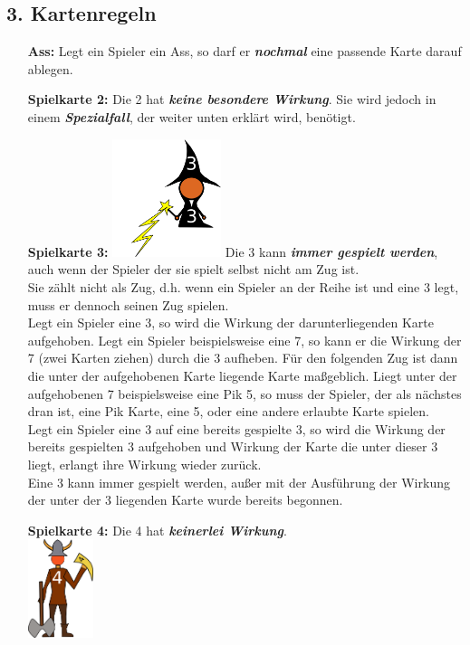 \documentclass{article}
\begin{document}
\subsection*{3. Kartenregeln}       
\begin{itemize}
\item[\textbf{Ass:}] Legt ein Spieler ein Ass, so darf er \textit{\textbf{nochmal}} eine passende Karte darauf ablegen. 
\item[ \textbf{Spielkarte 2:}] Die 2 hat \textit{\textbf{keine besondere Wirkung}}. Sie wird jedoch in einem \textit{\textbf{Spezialfall}}, der weiter unten erklärt wird, benötigt.
\item[\textbf{Spielkarte 3:}]
\includegraphics[width=0.25\textwidth]{photos/wizard.png}
Die 3 kann \textit{\textbf{immer gespielt werden}}, auch wenn der Spieler der sie spielt selbst nicht am Zug ist. \\ Sie zählt nicht als Zug, d.h. wenn ein Spieler an der Reihe ist und eine 3 legt, muss er dennoch seinen Zug spielen. \\
Legt ein Spieler eine 3, so wird die Wirkung der darunterliegenden Karte aufgehoben. Legt ein Spieler beispielsweise eine 7, so kann er die Wirkung der 7 (zwei Karten ziehen) durch die 3 aufheben. Für den folgenden Zug ist dann die
unter der aufgehobenen Karte liegende Karte maßgeblich. Liegt unter der aufgehobenen 7 beispielsweise eine Pik 5, so muss der Spieler, der als nächstes dran ist, eine Pik Karte, eine 5, oder eine andere erlaubte Karte spielen. \\
Legt ein Spieler eine 3 auf eine bereits gespielte 3, so wird die Wirkung der bereits gespielten 3 aufgehoben und Wirkung der Karte die unter dieser 3 liegt, erlangt ihre Wirkung wieder zurück. \\ Eine 3 kann immer gespielt werden, außer mit der Ausführung der Wirkung der unter der 3 liegenden Karte wurde bereits begonnen.
\item[\textbf{Spielkarte 4:}]
Die 4 hat \textit{\textbf{keinerlei Wirkung}}. \\
\includegraphics[width=0.15\textwidth]{photos/viking.png}

\end{itemize}
\end{document}
